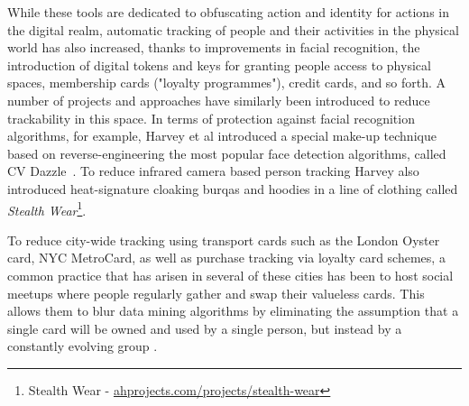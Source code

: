 \documentclass{IOS-Book-Article}     %
\newcommand{\tbox}[3][red]{{
\color{#1}\noindent{
   \fbox{\scriptsize{ {\bf #2} \textsl{#3}}}
   \vspace{2pt}
}
}}
\newcommand{\todo}[1]{\tbox{TODO:}{#1}}
\begin{document}
While these tools are dedicated to obfuscating action and identity for actions in the digital realm, automatic tracking of people and their activities in the physical world has also increased, thanks to improvements in facial recognition, the introduction of digital tokens and keys for granting people access to physical spaces, membership cards ("loyalty programmes"), credit cards, and so forth.  A number of projects and approaches have similarly been introduced to reduce trackability in this space.  In terms of protection against facial recognition algorithms, for example, Harvey et al introduced a special make-up technique based on reverse-engineering the most popular face detection algorithms, called CV Dazzle~\cite{harvey2012cv}. To reduce infrared camera based person tracking Harvey also introduced heat-signature cloaking burqas and hoodies in a line of clothing called \emph{Stealth Wear}\footnote{Stealth Wear - \url{ahprojects.com/projects/stealth-wear}}.

To reduce city-wide tracking using transport cards such as the London Oyster card, NYC MetroCard, as well as  purchase tracking via loyalty card schemes, a common practice that has arisen in several of these cities has been to host social meetups where people regularly gather and swap their valueless cards.  This allows them to blur data mining algorithms by eliminating the assumption that a single card will be owned and used by a single person, but instead by a constantly evolving group \cite{lockton}.

% 

\end{document}
